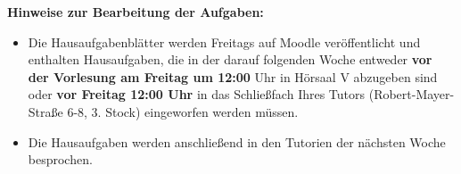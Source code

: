 \documentclass[a4paper]{article}
\begin{document}
\textbf{Hinweise zur Bearbeitung der Aufgaben:}
\begin{itemize}
    \item Die Hausaufgabenblätter werden Freitags auf Moodle veröffentlicht und enthalten Hausaufgaben, die in der darauf folgenden Woche entweder \textbf{vor der Vorlesung am Freitag um 12:00} Uhr in Hörsaal V abzugeben sind oder \textbf{vor Freitag 12:00 Uhr} in das Schließfach Ihres Tutors (Robert-Mayer-Straße 6-8, 3. Stock) eingeworfen werden müssen.
    \item Die Hausaufgaben werden anschließend in den Tutorien der nächsten Woche besprochen.
\end{itemize}
\end{document}
